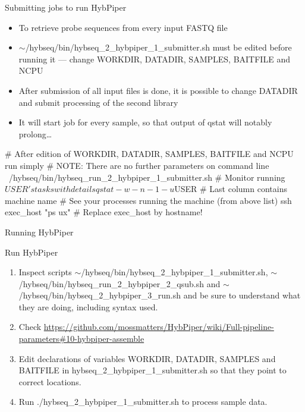 \documentclass[compress,  xelatex, 11pt, xcolor=x11names, aspectratio=169,
	hyperref={
		bookmarks=true,
		unicode=true,
		colorlinks=true,
		pdftitle={HybSeq course},
		plainpages=false,
		pdfauthor={Vojtech Zeisek},
		pdfsubject={Practical processing of HybSeq target enrichment sequencing data on computing grids like MetaCentrum},
		pdfcreator={XeLaTeX},
		pdfkeywords={BASH, command line, GNU, HybSeq, Linux, MetaCentrum, sequencing shell, target enrichment},
		linkcolor=Turquoise4, %
		anchorcolor=DodgerBlue4, %
		citecolor=DodgerBlue4, %
		filecolor=DodgerBlue4, %
		menucolor=Tan4, %
		urlcolor=DarkOliveGreen4 %
		},
	url={hyphens, lowtilde} %
	]{beamer}
\renewcommand{\texttt}[1]{\colorbox{Cornsilk2}{{\ttfamily #1}}}
\renewcommand{\alert}[1]{\textcolor{OrangeRed3}{#1}}
\begin{document}
\begin{frame}[fragile]{Submitting jobs to run HybPiper}
	\begin{itemize}
		\item To retrieve probe sequences from every input FASTQ file
		\item \alert{\texttt{$\sim$/hybseq/bin/hybseq\_2\_hybpiper\_1\_submitter.sh} must be edited before running it --- change \texttt{WORKDIR}, \texttt{DATADIR}, \texttt{SAMPLES}, \texttt{BAITFILE} and \texttt{NCPU}}
		\item After submission of all input files is done, it is possible to change \texttt{DATADIR} and submit processing of the second library
		\item It will start job for every sample, so that output of \texttt{qstat} will notably prolong\ldots
	\end{itemize}
	\begin{bashcode}
    # After edition of WORKDIR, DATADIR, SAMPLES, BAITFILE and NCPU run simply
    # NOTE: There are no further parameters on command line
    ~/hybseq/bin/hybseq_run_2_hybpiper_1_submitter.sh
    # Monitor running $USER's tasks with details
    qstat -w -n -1 -u $USER # Last column contains machine name
    # See your processes running the machine (from above list)
    ssh exec_host "ps ux" # Replace exec_host by hostname!
	\end{bashcode}
\end{frame}

\begin{frame}{Running HybPiper}
	\begin{exampleblock}{Run HybPiper}
		\begin{enumerate}
			\item Inspect scripts \texttt{$\sim$/hybseq/bin/hybseq\_2\_hybpiper\_1\_submitter.sh}, \texttt{$\sim$/hybseq/bin/hybseq\_run\_2\_hybpiper\_2\_qsub.sh} and \texttt{$\sim$/hybseq/bin/hybseq\_2\_hybpiper\_3\_run.sh} and be sure to understand what they are doing, including syntax used.
			\item Check \url{https://github.com/mossmatters/HybPiper/wiki/Full-pipeline-parameters\#10-hybpiper-assemble}
			\item Edit declarations of variables \texttt{WORKDIR}, \texttt{DATADIR}, \texttt{SAMPLES} and \texttt{BAITFILE} in \texttt{hybseq\_2\_hybpiper\_1\_submitter.sh} so that they point to correct locations.
			\item Run \texttt{./hybseq\_2\_hybpiper\_1\_submitter.sh} to process sample data.
		\end{enumerate}
	\end{exampleblock}
\end{frame}
\end{document}
